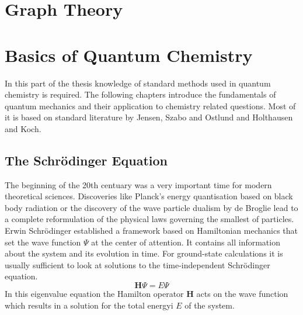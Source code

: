 

\chapter{Graph Theory}
\label{sec:graphtheory}

\chapter{Basics of Quantum Chemistry}
\label{sec:basicsofQC}

In this part of the thesis knowledge of standard methods used in quantum
chemistry is required. The following chapters introduce the fundamentals of
quantum mechanics and their application to chemistry related questions. Most of
it is based on standard literature by
Jensen\autocite{Jensen_IntroductionComputationalChemistry_2007}, Szabo and
Ostlund\autocite{Szabo_ModernQuantumChemistry_1996} and Holthausen and
Koch\autocite{Koch_ChemistGuideDensity_2001}.

\section{The Schr\"odinger Equation}
\label{sec:schrodingerequation}

The beginning of the 20th centuary was a very important time for modern
theoretical sciences. Discoveries like Planck's energy quantisation based on
black body radiation or the discovery of the wave particle dualism by de
Broglie lead to a complete reformulation of the physical laws governing the
smallest of particles. Erwin Schr\"odinger established a framework based on
Hamiltonian mechanics that set the wave function $\Psi$ at the center of
attention. It contains all information about the system and its evolution in
time. For ground-state calculations it is usually sufficient to look at
solutions to the time-independent Schr\"odinger equation.%
%
\begin{equation}
	\mathbf{H}\Psi=E\Psi\label{eqn:SchrodingerEquation}
\end{equation}%
%
In this eigenvalue equation the Hamilton operator $\mathbf{H}$ acts on the wave
function which results in a solution for the total energyi $E$ of the system. 

